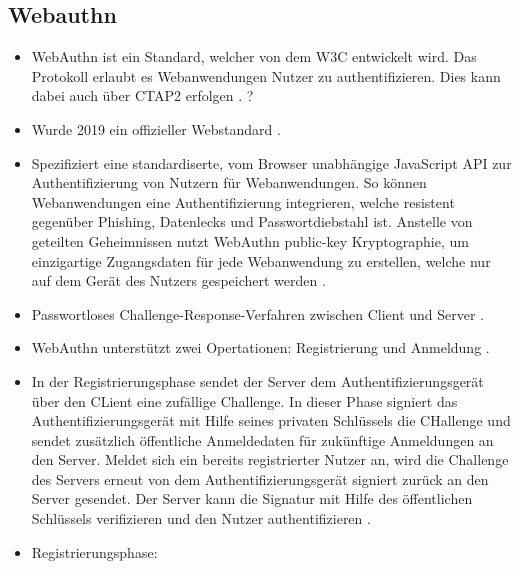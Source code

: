 \subsection{Webauthn}

\begin{itemize}
    \item WebAuthn ist ein Standard, welcher von dem \ac{W3C} entwickelt wird. Das Protokoll erlaubt es Webanwendungen Nutzer zu authentifizieren. Dies kann dabei auch über \ac{CTAP2} erfolgen \cite{lyastani2020fido2}. ?
    \item Wurde 2019 ein offizieller Webstandard \cite{farke2020you}.
    \item Spezifiziert eine standardiserte, vom Browser unabhängige JavaScript API zur Authentifizierung von Nutzern für Webanwendungen. So können Webanwendungen eine Authentifizierung integrieren, welche resistent gegenüber Phishing, Datenlecks und Passwortdiebstahl ist. Anstelle von geteilten Geheimnissen nutzt WebAuthn public-key Kryptographie, um einzigartige Zugangsdaten für jede Webanwendung zu erstellen, welche nur auf dem Gerät des Nutzers gespeichert werden \cite{farke2020you}.
    \item Passwortloses Challenge-Response-Verfahren zwischen Client und Server \cite{barbosa2021provable}.
    \item WebAuthn unterstützt zwei Opertationen: Registrierung und Anmeldung \cite{barbosa2021provable}.
    \item In der Registrierungsphase sendet der Server dem Authentifizierungsgerät über den CLient eine zufällige Challenge. In dieser Phase signiert das Authentifizierungsgerät mit Hilfe seines privaten Schlüssels die CHallenge und sendet zusätzlich  öffentliche Anmeldedaten für zukünftige Anmeldungen an den Server. Meldet sich ein bereits registrierter Nutzer an, wird die Challenge des Servers erneut von dem Authentifizierungsgerät signiert zurück an den Server gesendet. Der Server kann die Signatur mit Hilfe des öffentlichen Schlüssels verifizieren und den Nutzer authentifizieren \cite{barbosa2021provable}.
    \item Registrierungsphase:

\end{itemize}
